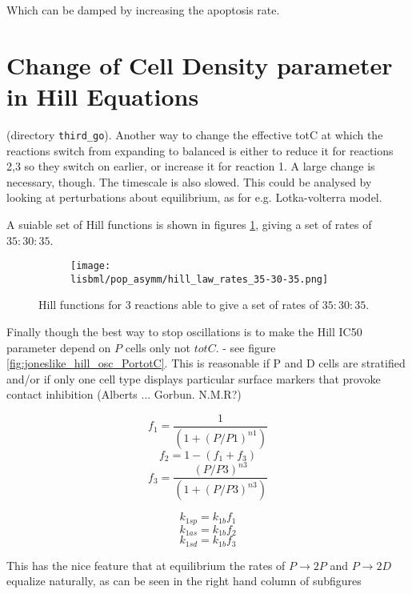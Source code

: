 \documentclass[a4paper,10pt]{report}
\newcommand{\psortbase}{/home/ngrs2/work/bsu/PSORT_Zuliani_Reynolds/}
\newcommand{\sbmlbase}{\psortbase/sbml-sh/}
\newcommand{\lisbml}{\sbmlbase/li_like}
\begin{document}
Which can be damped by increasing the apoptosis rate.


\section{Change of Cell Density parameter in Hill Equations}

(directory {\tt third\_go}). 
Another way to change the effective totC at which the reactions switch from expanding to balanced is  either to reduce it for reactions 2,3 so they switch on earlier, or increase it for reaction 1. A large change is necessary, though. The timescale is also slowed. This could be analysed by looking at perturbations about equilibrium, as for e.g. Lotka-volterra model. 

A suiable set of Hill functions is shown in figures \ref{fig:joneslike_hill_functions}, giving a set of rates of $35:30:35$. 

\begin{figure}[h!]
  \begin{subfigure}{\textwidth}
  \centering
    \texttt{[image: \\lisbml/pop\_asymm/hill\_law\_rates\_35-30-35.png]}
  \end{subfigure}
  \caption{Hill functions for 3 reactions able to  give a set of rates of $35:30:35$.}
  \label{fig:joneslike_hill_functions}
\end{figure}

Finally though the best way to stop oscillations is to make the Hill IC50 parameter depend on $P$ cells only not $totC$. - see figure \ref{fig:joneslike_hill_osc_PortotC}. This is reasonable if P and D cells are stratified and/or if only one cell type displays particular surface markers that provoke contact inhibition (Alberts ... Gorbun. N.M.R?)

\[
f_1 = \frac{1}{(1 + (P/P1)^{n1})}
\]
\[
f_2 = 1 - (f_1 + f_3)
\]
\[
f_3 = \frac{(P/P3)^{n3}}{(1 + (P/P3)^{n3})}
\]

\[
k_{1sp} = k_{1b} f_1
\]
\[
k_{1as} = k_{1b} f_2 
\]
\[
k_{1sd} = k_{1b} f_3 
\]



This has the nice feature that at equilibrium the rates of $P \rightarrow 2P$ 
and $P \rightarrow 2D$ equalize naturally, as can be seen in the right hand column of subfigures 
\end{document}
